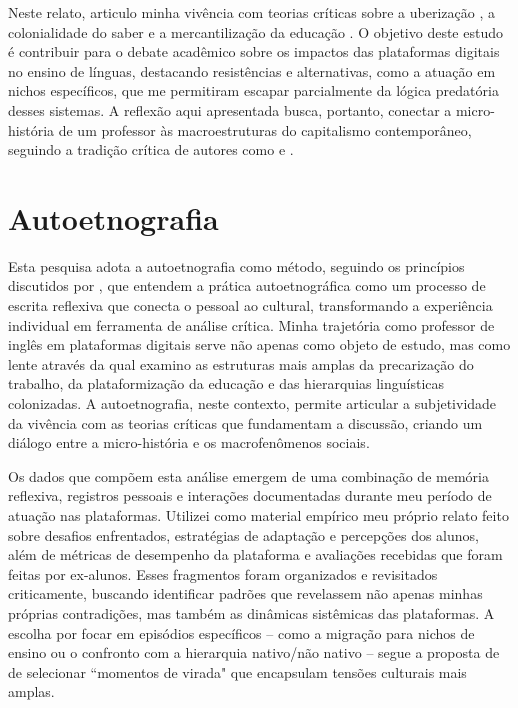 \documentclass[portuguese]{textolivre}
\begin{document}
Neste relato, articulo minha vivência com teorias críticas sobre a uberização \cite{antunes2020, abilio2021, braga2017rebeldia}, a colonialidade do saber \cite{lander2005} e a mercantilização da educação \cite{block-gray2012}. O objetivo deste estudo é contribuir para o debate acadêmico sobre os impactos das plataformas digitais no ensino de línguas, destacando resistências e alternativas, como a atuação em nichos específicos, que me permitiram escapar parcialmente da lógica predatória desses sistemas. A reflexão aqui apresentada busca, portanto, conectar a micro-história de um professor às macroestruturas do capitalismo contemporâneo, seguindo a tradição crítica de autores como \textcite{harvey2014neoliberalismo} e \textcite{antunes2020}.

\section{Autoetnografia}
Esta pesquisa adota a autoetnografia como método, seguindo os princípios discutidos por \textcite{adams2015}, que entendem a prática autoetnográfica como um processo de escrita reflexiva que conecta o pessoal ao cultural, transformando a experiência individual em ferramenta de análise crítica. Minha trajetória como professor de inglês em plataformas digitais serve não apenas como objeto de estudo, mas como lente através da qual examino as estruturas mais amplas da precarização do trabalho, da plataformização da educação e das hierarquias linguísticas colonizadas. A autoetnografia, neste contexto, permite articular a subjetividade da vivência com as teorias críticas que fundamentam a discussão, criando um diálogo entre a micro-história e os macrofenômenos sociais.

Os dados que compõem esta análise emergem de uma combinação de memória reflexiva, registros pessoais e interações documentadas durante meu período de atuação nas plataformas. Utilizei como material empírico meu próprio relato feito sobre desafios enfrentados, estratégias de adaptação e percepções dos alunos, além de métricas de desempenho da plataforma e avaliações recebidas que foram feitas por ex-alunos. Esses fragmentos foram organizados e revisitados criticamente, buscando identificar padrões que revelassem não apenas minhas próprias contradições, mas também as dinâmicas sistêmicas das plataformas. A escolha por focar em episódios específicos -- como a migração para nichos de ensino ou o confronto com a hierarquia nativo/não nativo -- segue a proposta de \textcite{adams2015} de selecionar ``momentos de virada" que encapsulam tensões culturais mais amplas.
\end{document}
